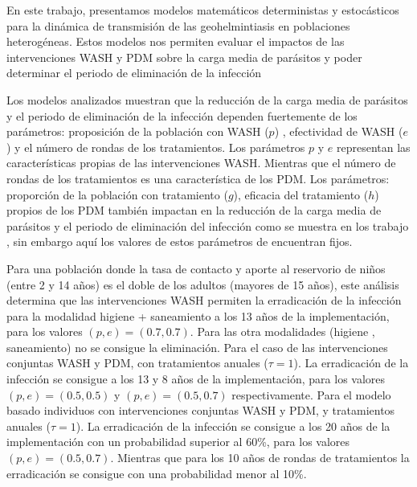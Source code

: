 \documentclass[12pt,a4paper]{article}
\theoremstyle{plain}%
\theoremstyle{definition}
\theoremstyle{remark}
\begin{document}
	
	En este trabajo, presentamos 
	modelos matemáticos deterministas y estocásticos para la dinámica de transmisión de las geohelmintiasis en poblaciones heterogéneas.  Estos modelos nos permiten evaluar el impactos de las intervenciones  WASH y PDM sobre la carga media de parásitos y poder determinar el periodo de eliminación de la infección
	 
	
	Los modelos analizados muestran que la reducción de la carga media de parásitos y el periodo de eliminación de la infección dependen fuertemente de los parámetros:  proposición de la población con WASH ($p$) , efectividad de WASH ($e$) y el número de rondas de los tratamientos. Los parámetros $p$ y $e$ representan las características propias de las intervenciones WASH. 
	Mientras que el número de rondas de los tratamientos es una característica de los PDM. Los parámetros: proporción de la población con tratamiento ($g$), eficacia del tratamiento ($h$) propios de los PDM también impactan en la reducción de la carga media de parásitos y el periodo de eliminación del infección como se muestra en los trabajo \cite{anderson2014coverage,truscott2014modeling}, sin embargo aquí los valores de estos parámetros de encuentran fijos.     
	
  
	Para una población %
	donde la tasa de contacto y aporte al reservorio de niños (entre 2 y 14 años) es el doble de los adultos (mayores de 15 años), este análisis determina que   
	las intervenciones WASH permiten la erradicación de la infección para la modalidad  higiene + saneamiento a los 13 años de la implementación, para los valores $(p,e)=(0.7,0.7)$. Para las otra modalidades (higiene , saneamiento) no se consigue la eliminación. Para el caso de las intervenciones conjuntas WASH y PDM, con tratamientos anuales ($\tau=1$). La erradicación de la infección se consigue a los 13 y 8 años de la implementación, para los valores $(p,e)=(0.5,0.5)$ y $(p,e)=(0.5,0.7)$  respectivamente. 
	Para el modelo basado individuos con intervenciones conjuntas WASH y PDM, y tratamientos anuales ($\tau=1$). 
	La erradicación de la infección se consigue a los 20 años de la implementación con un probabilidad superior al 60\%, para los valores $(p,e)=(0.5,0.7)$. Mientras que para los 10 años de rondas de tratamientos la erradicación se consigue con una probabilidad menor al 10\%.
	
\end{document}
